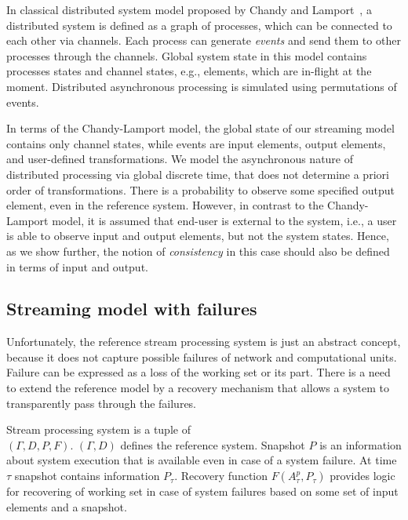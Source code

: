 In classical distributed system model proposed by Chandy and Lamport~\cite{Chandy:1985:DSD:214451.214456}, a distributed system is defined as a graph of processes, which can be connected to each other via channels. Each process can generate {\em events} and send them to other processes through the channels. Global system state in this model contains processes states and channel states, e.g., elements, which are in-flight at the moment. Distributed asynchronous processing is simulated using permutations of events. 

In terms of the Chandy-Lamport model, the global state of our streaming model contains only channel states, while events are input elements, output elements, and user-defined transformations. We model the asynchronous nature of distributed processing via global discrete time, that does not determine a priori order of transformations. There is a probability to observe some specified output element, even in the reference system. However, in contrast to the Chandy-Lamport model, it is assumed that end-user is external to the system, i.e., a user is able to observe input and output elements, but not the system states. Hence, as we show further, the notion of {\em consistency} in this case should also be defined in terms of input and output.  

\subsection{Streaming model with failures}

Unfortunately, the reference stream processing system is just an abstract concept, because it does not capture possible failures of network and computational units. Failure can be expressed as a loss of the working set or its part. There is a need to extend the reference model by a recovery mechanism that allows a system to transparently pass through the failures.


\begin{definition}{Stream processing system}
is a tuple of\\
$(\Gamma,D,P,F)$. $(\Gamma, D)$ defines the reference system. Snapshot $P$ is an information about system execution that is available even in case of a system failure. At time $\tau$ snapshot contains information $P_\tau$. Recovery function $F(A^{p}_\tau,P_\tau)$ provides logic for recovering of working set in case of system failures based on some set of input elements and a snapshot.
\end{definition}

